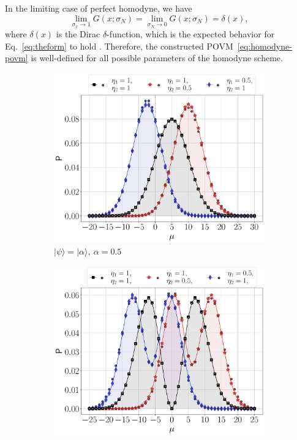 \documentclass[%
reprint,
superscriptaddress,
 amsmath,amssymb,amsfonts,
 aps,
 pra,
 longbibliography
]{revtex4-2}
\newcommand{\ket}[1]{\ensuremath{|{#1}\rangle}}
\begin{document}
In the limiting case of perfect homodyne,
we have
\begin{equation}
    \lim_{\sigma_x \to 1}G(x;\sigma_N)=\lim_{\sigma_N \to 0}G(x;\sigma_N)=\delta(x),
\end{equation}
where $\delta(x)$ is the Dirac $\delta$-function,
which is the expected behavior for
Eq.~\eqref{eq:theform} to hold .
Therefore, the constructed POVM~\eqref{eq:homodyne-povm}
is well-defined for all possible parameters of the homodyne scheme.

  




\begin{figure}
    \centering
    \begin{subfigure}[]{.45\textwidth}
\includegraphics[width=\linewidth]{pics/homodyne/coherent_distributions.pdf}
\caption[]{$\ket{\psi}=\ket{\alpha},\:$$\alpha=0.5$}
\label{fig:dist_alp}
        \end{subfigure}
        \begin{subfigure}[]{.45\textwidth}
 \includegraphics[width=\linewidth]{pics/homodyne/fock_distributions.pdf}

\end{subfigure}
\end{figure}
\end{document}

